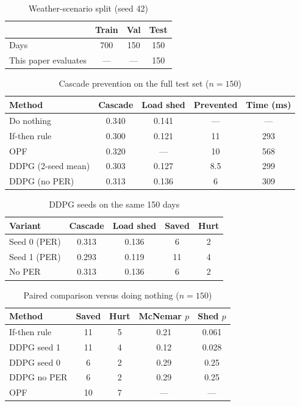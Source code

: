 \begin{table}[t]
\centering
\caption{Weather-scenario split (seed 42)}
\label{tab:dataset}
\begin{tabular}{lccc}
\toprule
 & Train & Val & Test \\
\midrule
Days & 700 & 150 & 150 \\
This paper evaluates & --- & --- & 150 \\
\bottomrule
\end{tabular}
\end{table}

\begin{table}[t]
\centering
\caption{Cascade prevention on the full test set ($n=150$)}
\label{tab:results}
\begin{tabular}{lcccc}
\toprule
Method & Cascade & Load shed & Prevented & Time (ms) \\
\midrule
Do nothing   & 0.340 & 0.141 & --- & --- \\
If-then rule & 0.300 & 0.121 & 11  & 293 \\
OPF          & 0.320 & ---   & 10  & 568 \\
DDPG (2-seed mean) & 0.303 & 0.127 & 8.5 & 299 \\
DDPG (no PER) & 0.313 & 0.136 & 6  & 309 \\
\bottomrule
\end{tabular}
\end{table}

\begin{table}[t]
\centering
\caption{DDPG seeds on the same 150 days}
\label{tab:seeds}
\begin{tabular}{lcccc}
\toprule
Variant & Cascade & Load shed & Saved & Hurt \\
\midrule
Seed 0 (PER) & 0.313 & 0.136 & 6 & 2 \\
Seed 1 (PER) & 0.293 & 0.119 & 11 & 4 \\
No PER       & 0.313 & 0.136 & 6 & 2 \\
\bottomrule
\end{tabular}
\end{table}

\begin{table}[t]
\centering
\caption{Paired comparison versus doing nothing ($n=150$)}
\label{tab:paired}
\begin{tabular}{lcccc}
\toprule
Method & Saved & Hurt & McNemar $p$ & Shed $p$ \\
\midrule
If-then rule & 11 & 5 & 0.21 & 0.061 \\
DDPG seed 1  & 11 & 4 & 0.12 & 0.028 \\
DDPG seed 0  & 6  & 2 & 0.29 & 0.25 \\
DDPG no PER  & 6  & 2 & 0.29 & 0.25 \\
OPF          & 10 & 7 & ---  & --- \\
\bottomrule
\end{tabular}
\end{table}

